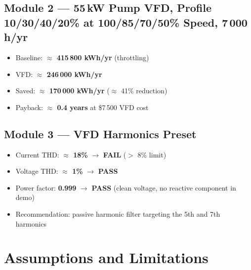 \documentclass[11pt,a4paper]{article}
\begin{document}
\subsection{Module 2 --- 55\,kW Pump VFD, Profile 10/30/40/20\% at 100/85/70/50\% Speed, 7\,000 h/yr}

\begin{itemize}[nosep]
    \item Baseline: \textbf{$\approx$ 415\,800 kWh/yr} (throttling)
    \item VFD: \textbf{$\approx$ 246\,000 kWh/yr}
    \item Saved: \textbf{$\approx$ 170\,000 kWh/yr} ($\approx$ 41\% reduction)
    \item Payback: \textbf{$\approx$ 0.4 years} at \$7\,500 VFD cost
\end{itemize}

\subsection{Module 3 --- VFD Harmonics Preset}

\begin{itemize}[nosep]
    \item Current THD: \textbf{$\approx$ 18\%} $\to$ \textbf{FAIL} ($>$ 8\% limit)
    \item Voltage THD: \textbf{$\approx$ 1\%} $\to$ \textbf{PASS}
    \item Power factor: \textbf{0.999} $\to$ \textbf{PASS} (clean voltage, no reactive component in demo)
    \item Recommendation: passive harmonic filter targeting the 5th and 7th harmonics
\end{itemize}

\section{Assumptions and Limitations}
\label{sec:assumptions}
\end{document}
